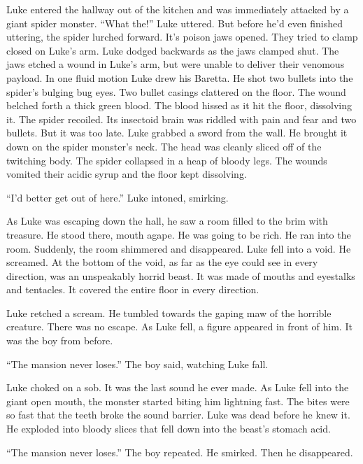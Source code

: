 Luke entered the hallway out of the kitchen and was immediately
attacked by a giant spider monster. ``What the!'' Luke
uttered. But before he'd even finished uttering, the spider
lurched forward. It's poison jaws opened. They tried to clamp
closed on Luke's arm. Luke dodged backwards as the jaws
clamped shut. The jaws etched a wound in Luke's arm, but were
unable to deliver their venomous payload. In one fluid motion Luke
drew his Baretta. He shot two bullets into the spider's
bulging bug eyes. Two bullet casings clattered on the floor. The
wound belched forth a thick green blood. The blood hissed as it hit
the floor, dissolving it. The spider recoiled. Its insectoid brain
was riddled with pain and fear and two bullets. But it was too
late. Luke grabbed a sword from the wall. He brought it down on the
spider monster's neck. The head was cleanly sliced off of the
twitching body. The spider collapsed in a heap of bloody legs. The
wounds vomited their acidic syrup and the floor kept
dissolving.



``I'd better get out of here.'' Luke intoned,
smirking.



As Luke was escaping down the hall, he saw a room filled to the
brim with treasure. He stood there, mouth agape. He was going to be
rich. He ran into the room. Suddenly, the room shimmered and
disappeared. Luke fell into a void. He screamed. At the bottom of
the void, as far as the eye could see in every direction, was an
unspeakably horrid beast. It was made of mouths and eyestalks and
tentacles. It covered the entire floor in every direction.



Luke retched a scream. He tumbled towards the gaping maw of the
horrible creature. There was no escape. As Luke fell, a figure
appeared in front of him. It was the boy from before.



``The mansion never loses.'' The boy said, watching Luke
fall.



Luke choked on a sob. It was the last sound he ever made. As Luke
fell into the giant open mouth, the monster started biting him
lightning fast. The bites were so fast that the teeth broke the
sound barrier. Luke was dead before he knew it. He exploded into
bloody slices that fell down into the beast's stomach
acid.



``The mansion never loses.'' The boy repeated. He
smirked. Then he disappeared.


